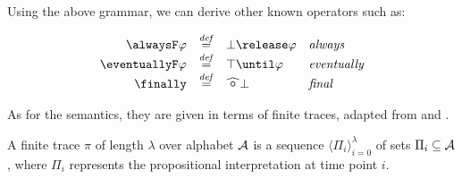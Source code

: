 Using the above grammar, we can derive other known operators such as:

\[
\begin{array}{rcll}
       \alwaysF \varphi  & \defeq & \bot \release \varphi             & \text{\emph{always}}\\
   \eventuallyF \varphi  & \defeq & \top \until \varphi               & \text{\emph{eventually}}\\
               \finally  & \defeq & \wnext \bot                   & \text{\emph{final}}
\end{array}
\]


As for the semantics, they are given in terms of finite traces, adapted from \cite{giavar15a} and \cite{cabsch19b}. 

\begin{definition}
    A finite trace $\pi$ of length $\lambda$ over alphabet $\mathcal{A }$ is a sequence ${\langle \Pi_i \rangle}_{i=0}^{\lambda}$ of sets $\Pi_i \subseteq \mathcal{A }$, where $\Pi_i$ represents the propositional interpretation at time point $i$.
\end{definition}



